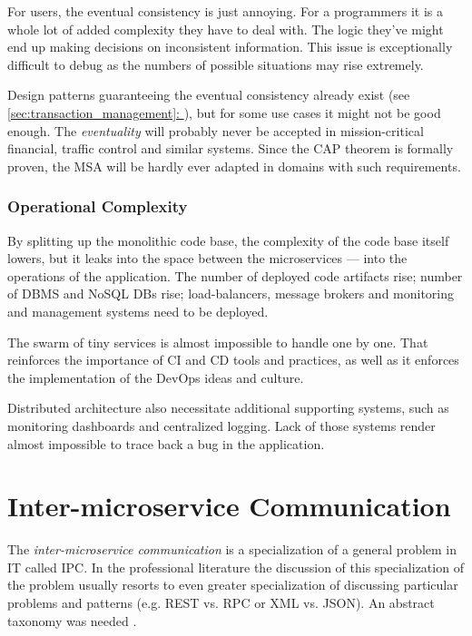 \documentclass[thesis=M,english,hidelinks]{FITthesis}[2012/10/20]
\newcommand*{\fullref}[1]{\hyperref[{#1}]{\autoref*{#1}: \textit{\nameref*{#1}}}}
\begin{document}
For users, the eventual consistency is just annoying. For a programmers it is a whole lot of added complexity they have to deal with. The logic they've might end up making decisions on inconsistent information. This issue is exceptionally difficult to debug as the numbers of possible situations may rise extremely.

Design patterns guaranteeing the eventual consistency already exist (see \fullref{sec:transaction_management}), but for some use cases it might not be good enough. The \textit{eventuality} will probably never be accepted in mission-critical financial, traffic control and similar systems. Since the \acrshort{CAP} theorem is formally proven, the \acrshort{MSA} will be hardly ever adapted in domains with such requirements.

\subsubsection{Operational Complexity}
By splitting up the monolithic code base, the complexity of the code base itself lowers, but it leaks into the space between the microservices --- into the operations of the application. The number of deployed code artifacts rise; number of \acrshort{DBMS} and NoSQL \acrshort{DB}s rise; load-balancers, message brokers and monitoring and management systems need to be deployed.

The swarm of tiny services is almost impossible to handle one by one. That reinforces the importance of \acrfull{CI} and \acrfull{CD} tools and practices, as well as it enforces the implementation of the DevOps ideas and culture.

Distributed architecture also necessitate additional supporting systems, such as monitoring dashboards and centralized logging. Lack of those systems render almost impossible to trace back a bug in the application.

% 
% 

\section{Inter-microservice Communication}
\label{sec:inter-service-communication}

The \textit{inter-microservice communication} is a specialization of a general problem in \acrshort{IT} called \acrfull{IPC}. In the professional literature the discussion of this specialization of the problem usually resorts to even greater specialization of discussing particular problems and patterns (e.g. \acrshort{REST} vs. \acrshort{RPC} or \acrshort{XML} vs. \acrshort{JSON}). An abstract taxonomy was needed \cite{ms-taxonomy}.
\end{document}
